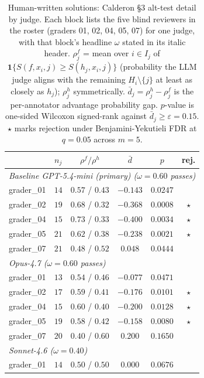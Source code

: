 \begin{table}[p]
\centering\footnotesize
\caption{Human-written solutions: Calderon \S3 alt-test detail by judge. Each block lists the five blind reviewers in the roster (graders 01, 02, 04, 05, 07) for one judge, with that block's headline $\omega$ stated in its italic header. $\rho^f_j$ = mean over $i \in I_j$ of $\mathbf{1}\{S(f,x_i,j) \geq S(h_j,x_i,j)\}$ (probability the LLM judge aligns with the remaining $H_i\setminus\{j\}$ at least as closely as $h_j$); $\rho^h_j$ symmetrically. $\bar{d}_j = \rho^h_j - \rho^f_j$ is the per-annotator advantage probability gap. $p$-value is one-sided Wilcoxon signed-rank against $\bar{d}_j \geq \varepsilon = 0.15$. $\star$ marks rejection under Benjamini-Yekutieli FDR at $q=0.05$ across $m=5$.}
\label{tbl-calderon-per-annotator-human}
\setlength{\tabcolsep}{4pt}
\begin{tabular*}{\textwidth}{@{\extracolsep{\fill}}lccccc@{}}
\toprule
 & $n_j$ & $\rho^f / \rho^h$ & $\bar{d}$ & $p$ & rej. \\
\midrule
\multicolumn{6}{l}{\textit{Baseline GPT-5.4-mini (primary) ($\omega=0.60$ passes)}} \\
\quad grader\_01 & $14$ & $0.57$ / $0.43$ & $-0.143$ & $0.0247$ &  \\
\quad grader\_02 & $19$ & $0.68$ / $0.32$ & $-0.368$ & $0.0008$ & $\star$ \\
\quad grader\_04 & $15$ & $0.73$ / $0.33$ & $-0.400$ & $0.0034$ & $\star$ \\
\quad grader\_05 & $21$ & $0.62$ / $0.38$ & $-0.238$ & $0.0021$ & $\star$ \\
\quad grader\_07 & $21$ & $0.48$ / $0.52$ & $0.048$ & $0.0444$ &  \\
\multicolumn{6}{l}{\textit{Opus-4.7 ($\omega=0.60$ passes)}} \\
\quad grader\_01 & $13$ & $0.54$ / $0.46$ & $-0.077$ & $0.0471$ &  \\
\quad grader\_02 & $17$ & $0.59$ / $0.41$ & $-0.176$ & $0.0101$ & $\star$ \\
\quad grader\_04 & $15$ & $0.60$ / $0.40$ & $-0.200$ & $0.0128$ & $\star$ \\
\quad grader\_05 & $19$ & $0.58$ / $0.42$ & $-0.158$ & $0.0080$ & $\star$ \\
\quad grader\_07 & $20$ & $0.40$ / $0.60$ & $0.200$ & $0.1650$ &  \\
\multicolumn{6}{l}{\textit{Sonnet-4.6 ($\omega=0.40$)}} \\
\quad grader\_01 & $14$ & $0.50$ / $0.50$ & $0.000$ & $0.0676$ &  \\

\end{tabular*}
\end{table}
